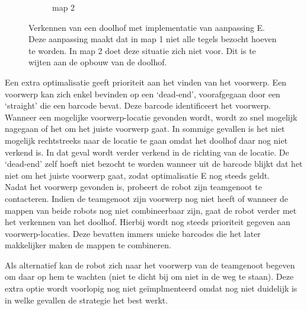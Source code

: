 \documentclass[tt1]{penoverslag}
\begin{document}
\begin{figure}
\begin{subfigure}[hb]{0.36\textwidth}
	\caption{map 2}
\end{subfigure}
\caption[Verkennen van een doolhof]{Verkennen van een doolhof met implementatie van aanpassing E. Deze aanpassing maakt dat in map 1 niet alle tegels bezocht hoeven te worden. In map 2 doet deze situatie zich niet voor. Dit is te wijten aan de opbouw van de doolhof.}
\label{fig:resultVerkenE}
\end{figure}

Een extra optimalisatie geeft prioriteit aan het vinden van het voorwerp. Een voorwerp kan zich enkel bevinden op een `dead-end', voorafgegaan door een `straight' die een barcode bevat. Deze barcode identificeert het voorwerp. Wanneer een mogelijke voorwerp-locatie gevonden wordt, wordt zo snel mogelijk nagegaan of het om het juiste voorwerp gaat. In sommige gevallen is het niet mogelijk rechtstreeks naar de locatie te gaan omdat het doolhof daar nog niet verkend is. In dat geval wordt verder verkend in de richting van de locatie. De `dead-end' zelf hoeft niet bezocht te worden wanneer uit de barcode blijkt dat het niet om het juiste voorwerp gaat, zodat optimalisatie E nog steeds geldt.\\

Nadat het voorwerp gevonden is, probeert de robot zijn teamgenoot te contacteren. Indien de teamgenoot zijn voorwerp nog niet heeft of wanneer de mappen van beide robots nog niet combineerbaar zijn, gaat de robot verder met het verkennen van het doolhof. Hierbij wordt nog steeds prioriteit gegeven aan voorwerp-locaties. Deze bevatten immers unieke barcodes die het later makkelijker maken de mappen te combineren.

Als alternatief kan de robot zich naar het voorwerp van de teamgenoot begeven om daar op hem te wachten (niet te dicht bij om niet in de weg te staan). Deze extra optie wordt voorlopig nog niet ge\"implmenteerd omdat nog niet duidelijk is in welke gevallen de strategie het best werkt.

\end{document}
